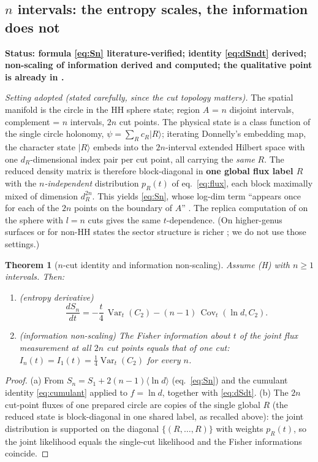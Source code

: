 \documentclass[11pt]{article}
\newtheorem{theorem}{Theorem}
\theoremstyle{remark}
\theoremstyle{plain}
\newcommand{\Var}{\operatorname{Var}}
\newcommand{\Cov}{\operatorname{Cov}}
\begin{document}
\subsection{\texorpdfstring{$n$}{n} intervals: the entropy scales, the information does not}\label{sec:ncuts}

\textbf{Status: formula \eqref{eq:Sn} literature-verified; identity \eqref{eq:dSndt} derived; non-scaling of information derived and computed; the qualitative point is already in \cite{D14}.}

\emph{Setting adopted (stated carefully, since the cut topology matters).} The spatial manifold is the circle in the HH sphere state; region $A$ = $n$ disjoint intervals, complement = $n$ intervals, $2n$ cut points. The physical state is a class function of the single circle holonomy, $\psi = \sum_R c_R |R\rangle$; iterating Donnelly's embedding map, the character state $|R\rangle$ embeds into the $2n$-interval extended Hilbert space with one $d_R$-dimensional index pair per cut point, all carrying the \emph{same} $R$. The reduced density matrix is therefore block-diagonal in \textbf{one global flux label $R$} with the \emph{$n$-independent} distribution $p_R(t)$ of eq.~\eqref{eq:flux}, each block maximally mixed of dimension $d_R^{2n}$. This yields \eqref{eq:Sn}, whose log-dim term ``appears once for each of the $2n$ points on the boundary of $A$'' \cite[verbatim]{D14}. The replica computation of \cite{GS14} on the sphere with $l = n$ cuts gives the same $t$-dependence. (On higher-genus surfaces or for non-HH states the sector structure is richer \cite{MOPT26}; we do not use those settings.)

\begin{theorem}[$n$-cut identity and information non-scaling]\label{thm:ncut}
Assume (H) with $n \geq 1$ intervals. Then:
\begin{enumerate}
\item[(a)] \emph{(entropy derivative)}
\begin{equation}\label{eq:dSndt}
\frac{dS_n}{dt} = -\frac{t}{4}\,\Var_t(C_2) - (n-1)\,\Cov_t(\ln d, C_2).
\end{equation}
\item[(b)] \emph{(information non-scaling)} The Fisher information about $t$ of the joint flux measurement at all $2n$ cut points equals that of one cut: $I_n(t) = I_1(t) = \tfrac14\Var_t(C_2)$ for every $n$.
\end{enumerate}
\end{theorem}

\begin{proof}
(a) From $S_n = S_1 + 2(n-1)\langle\ln d\rangle$ (eq.~\eqref{eq:Sn}) and the cumulant identity \eqref{eq:cumulant} applied to $f = \ln d$, together with \eqref{eq:dSdt}. (b) The $2n$ cut-point fluxes of one prepared circle are copies of the single global $R$ (the reduced state is block-diagonal in one shared label, as recalled above): the joint distribution is supported on the diagonal $\{(R, \dots, R)\}$ with weights $p_R(t)$, so the joint likelihood equals the single-cut likelihood and the Fisher informations coincide.
\end{proof}
\end{document}
